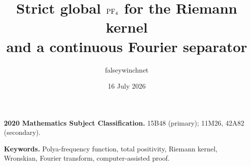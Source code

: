 \documentclass[11pt]{article}
\title{Strict global \texorpdfstring{$\mathrm{PF}_4$}{PF4} for the Riemann kernel\\
and a continuous Fourier separator}
\author{falseywinchnet}
\date{16 July 2026}
\begin{document}
\maketitle

\noindent\textbf{2020 Mathematics Subject Classification.}
15B48 (primary); 11M26, 42A82 (secondary).

\noindent\textbf{Keywords.}
Polya-frequency function, total positivity, Riemann kernel,
Wronskian, Fourier transform, computer-assisted proof.
\tableofcontents
















\appendix






\end{document}
